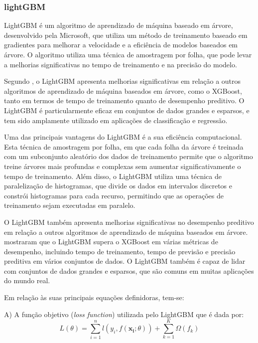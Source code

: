 \subsubsection{lightGBM}

LightGBM é um algoritmo de aprendizado de máquina baseado em árvore, desenvolvido pela Microsoft, que utiliza um método de treinamento baseado em gradientes para melhorar a velocidade e a eficiência de modelos baseados em árvore. O algoritmo utiliza uma técnica de amostragem por folha, que pode levar a melhorias significativas no tempo de treinamento e na precisão do modelo.

Segundo \cite{ke2017lightgbm}, o LightGBM apresenta melhorias significativas em relação a outros algoritmos de aprendizado de máquina baseados em árvore, como o XGBoost, tanto em termos de tempo de treinamento quanto de desempenho preditivo. O LightGBM é particularmente eficaz em conjuntos de dados grandes e esparsos, e tem sido amplamente utilizado em aplicações de classificação e regressão.

Uma das principais vantagens do LightGBM é a sua eficiência computacional. Esta técnica de amostragem por folha, em que cada folha da árvore é treinada com um subconjunto aleatório dos dados de treinamento permite que o algoritmo treine árvores mais profundas e complexas sem aumentar significativamente o tempo de treinamento. Além disso, o LightGBM utiliza uma técnica de paralelização de histogramas, que divide os dados em intervalos discretos e constrói histogramas para cada recurso, permitindo que as operações de treinamento sejam executadas em paralelo.

O LightGBM também apresenta melhorias significativas no desempenho preditivo em relação a outros algoritmos de aprendizado de máquina baseados em árvore. \cite{ke2017lightgbm} mostraram que o LightGBM supera o XGBoost em várias métricas de desempenho, incluindo tempo de treinamento, tempo de previsão e precisão preditiva em vários conjuntos de dados. O LightGBM também é capaz de lidar com conjuntos de dados grandes e esparsos, que são comuns em muitas aplicações do mundo real.

Em relação às suas principais equações definidoras, tem-se:

A) A função objetivo (\textit{loss function}) utilizada pelo LightGBM que é dada por:
\begin{equation}
    L(\theta) = \sum_{i=1}^n l(y_i, f(\mathbf{x_i};\theta)) + \sum_{k=1}^K \Omega(f_k)
\end{equation}

